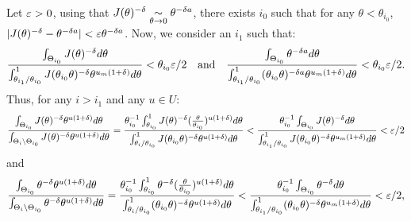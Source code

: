     Let $\varepsilon>0$, using that $J(\theta)^{-\delta}\underset{\theta\rightarrow0}{\sim}\theta^{-\delta a}$, there exists $i_0$ such that for any $\theta<\theta_{i_0}$, $|J(\theta)^{-\delta}-\theta^{-\delta a}|<\varepsilon\theta^{-\delta a}$. %
    Now, we consider an $i_1$ such that: %
        \begin{equation}
            \frac{\int_{\Theta_{i_0}}J(\theta)^{-\delta}d\theta }{\int_{\theta_{i_1}/\theta_{i_0}}^1J(\theta_{i_0}\theta)^{-\delta}\theta^{u_m(1+\delta)} d\theta}<\theta_{i_0}\varepsilon/2\quad \text{and}\quad
            \frac{\int_{\Theta_{i_0}}\theta^{-\delta a}d\theta }{\int_{\theta_{i_1}/\theta_{i_0}}^1(\theta_{i_0}\theta)^{-\delta a}\theta^{u_m(1+\delta)} d\theta}<\theta_{i_0}\varepsilon/2.
        \end{equation}
    Thus, for any $i>i_1$  and any $u\in U$:
        \begin{equation}
            \frac{\int_{\Theta_{i_0}} J(\theta)^{-\delta}\theta^{u(1+\delta)}  d\theta}{\int_{\Theta_{i}\setminus\Theta_{i_0} } J(\theta)^{-\delta }\theta^{u(1+\delta)}d\theta }
            = 
            \frac{\theta_{i_0}^{-1}\int_{\theta_{i_0}}^1 J(\theta)^{-\delta}(\frac{\theta}{\theta_{i_0}})^{u(1+\delta)}  d\theta}{\int_{\theta_{i}/\theta_{i_0}}^1 J(\theta_{i_0}\theta)^{-\delta }\theta^{u(1+\delta)} d\theta } %
            < \frac{\theta_{i_0}^{-1}\int_{\Theta_{i_0} }J(\theta)^{-\delta} d\theta}{\int_{\theta_{i_1}/\theta_{i_0} }^1 J(\theta_{i_0}\theta)^{-\delta }\theta^{u_m(1+\delta)}d\theta} < \eps/2
        \end{equation}
    and
        \begin{equation}
            \frac{\int_{\Theta_{i_0}} \theta^{-\delta}\theta^{u(1+\delta)}  d\theta}{\int_{\Theta_{i}\setminus\Theta_{i_0} } \theta^{-\delta }\theta^{u(1+\delta)}d\theta }
            = 
            \frac{\theta_{i_0}^{-1}\int_{\theta_{i_0}}^1 \theta^{-\delta}(\frac{\theta}{\theta_{i_0}})^{u(1+\delta)}  d\theta}{\int_{\theta_{i}/\theta_{i_0}}^1 (\theta_{i_0}\theta)^{-\delta }\theta^{u(1+\delta)} d\theta } %
            < \frac{\theta_{i_0}^{-1}\int_{\Theta_{i_0} }\theta^{-\delta} d\theta}{\int_{\theta_{i_1}/\theta_{i_0} }^1 (\theta_{i_0}\theta)^{-\delta }\theta^{u_m(1+\delta)}d\theta} < \eps/2,
        \end{equation}
